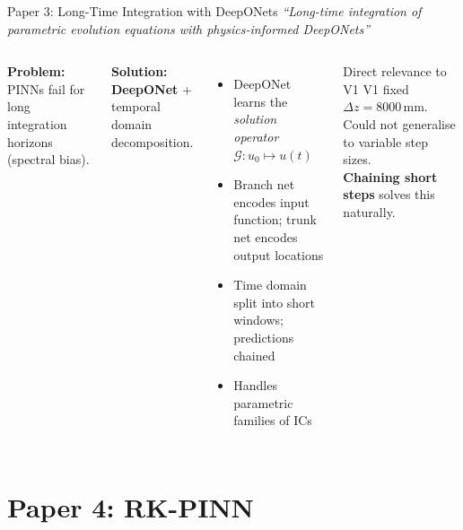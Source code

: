\documentclass[aspectratio=169, 11pt]{beamer}
\begin{document}
\begin{frame}{Paper 3: Long-Time Integration with DeepONets}
  \textit{``Long-time integration of parametric evolution equations with physics-informed DeepONets''}

  \begin{columns}[T]
    \textbf{Problem:} PINNs fail for long integration horizons (spectral bias).

    \textbf{Solution:} \textbf{DeepONet} + temporal domain decomposition.
    \begin{itemize}
      \item DeepONet learns the \emph{solution operator} $\mathcal{G}: u_0 \mapsto u(t)$
      \item Branch net encodes input function; trunk net encodes output locations
      \item Time domain split into short windows; predictions chained
      \item Handles parametric families of ICs
    \end{itemize}


    \medskip
    \begin{alertblock}{Direct relevance to V1}
      V1 fixed $\Delta z = 8000$\,mm. Could not generalise to variable step sizes. \\[2pt]
      \textbf{Chaining short steps} solves this naturally.
    \end{alertblock}
  \end{columns}
\end{frame}

\section{Paper 4: RK-PINN}
\end{document}

